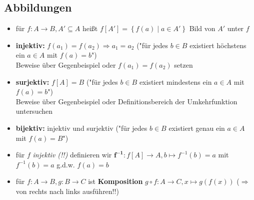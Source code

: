 \documentclass[10pt,a4paper]{article}
\begin{document}
\subsection{Abbildungen}
\begin{itemize}
\item für $f: A\rightarrow B, A'\subseteq A$ heißt $f[A']=\left\lbrace f(a)\mid a \in A'\right\rbrace$ Bild von $A'$ unter $f$
\item \textbf{injektiv:} $f(a_{1})=f(a_{2}) \Rightarrow a_{1}=a_{2}$ ("für jedes $b\in B$ existiert höchstens ein $a\in A$ mit $f(a)=b$")\\
Beweise über Gegenbeispiel oder $f(a_{1})=f(a_{2})$ setzen 
\item \textbf{surjektiv:} $f[A]=B$ ("für jedes $b\in B$ existiert mindestens ein $a\in A$ mit $f(a)=b$")\\ Beweise über Gegenbeispiel oder Definitionsbereich der Umkehrfunktion untersuchen 
\item \textbf{bijektiv:} injektiv und surjektiv ("für jedes $b\in B $ existiert genau ein $a\in A$ mit $f(a)=B$")
\item für $f$ \textit{injektiv (!!)}  definieren wir $\boldsymbol{f^{-1}: }f[A]\rightarrow A, b\mapsto f^{-1}(b)=a$ mit $f^{-1}(b)=a$  g.d.w. $f(a)=b$
\item für $f:A\rightarrow B, g: B\rightarrow C$ ist \textbf{Komposition} $ g\circ f:A\rightarrow C, x \mapsto g(f(x))$ ($\Rightarrow$ von rechts nach links ausführen!!)
\end{itemize}
\end{document}
